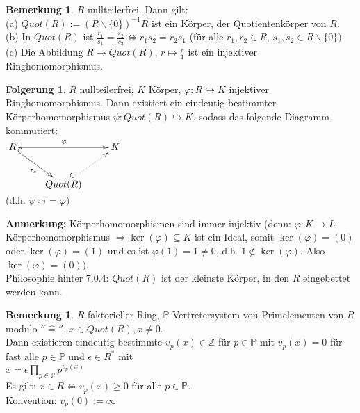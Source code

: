 \documentclass[10pt,a4paper,numbers=endperiod]{scrreprt}
\theoremstyle{definition}
\newtheorem{bem}[satz]{Bemerkung}
\newtheorem{folg}[satz]{Folgerung}
\def\ZZ{{\mathbb Z}}
\def\PP{{\mathbb P}}
\begin{document}
\begin{bem}
	$R$ nullteilerfrei. Dann gilt:\\
	(a) $Quot(R) := (R \backslash\{0\})^{-1} R$ ist ein Körper, der Quotientenkörper von $R$.\\
	(b) In $Quot(R)$ ist $\frac{r_1}{s_1} = \frac{r_2}{s_2} \Leftrightarrow r_1s_2 = r_2s_1$ (für alle $r_1, r_2 \in R$, $s_1, s_2 \in R \backslash \{0\})$\\
	(c) Die Abbildung $R \rightarrow Quot(R)$, $r \mapsto \frac{r}{1}$ ist ein injektiver Ringhomomorphismus.
\end{bem}

\begin{folg}
	$R$ nullteilerfrei, $K$ Körper, $\varphi: R \hookrightarrow K$ injektiver Ringhomomorphismus. Dann existiert ein eindeutig bestimmter Körperhomomorphismus $\psi: Quot(R) \hookrightarrow K$, sodass das  folgende Diagramm kommutiert:\\
	$\begin{xy}
	\xymatrix{
		R \ar@{^{(}->}[rr]^{\varphi} \ar@{^{(}->}[dr]_{\tau_s} &     &  K \\
		& Quot(R) \ar@{^{(}.>}[ur]
	}
	\end{xy}$\\
	(d.h. $\psi \circ \tau = \varphi)$
\end{folg}

\textbf{Anmerkung:} Körperhomomorphismen sind immer injektiv (denn: $\varphi: K \rightarrow L$ Körperhomomorphismus $\Rightarrow \ker(\varphi) \subseteq K$ ist ein Ideal, somit $\ker(\varphi) = (0)$ oder $\ker(\varphi) = (1)$ und es ist $\varphi(1) = 1 \neq 0$, d.h. $1 \notin \ker(\varphi)$. Also $\ker(\varphi) = (0))$.\\
Philosophie hinter 7.0.4: $Quot(R)$ ist der kleinste Körper, in den $R$ eingebettet werden kann.

\begin{bem}
	$R$ faktorieller Ring, $\PP$ Vertretersystem von Primelementen von $R$ modulo $''\hat{=}''$, $x \in Quot(R), x \neq 0$.\\
	Dann existieren eindeutig bestimmte $v_p(x) \in \ZZ$ für $p \in \PP$ mit $v_p(x) = 0$ für fast alle $p \in \PP$ und $\epsilon \in R^*$ mit\\
	$x = \epsilon \prod\limits_{p \in \PP} p^{v_p(x)}$\\
	Es gilt: $x \in R \Leftrightarrow v_p(x) \geq 0$ für alle $p \in \PP$.\\
	Konvention: $v_p(0) := \infty$
\end{bem}
\end{document}
